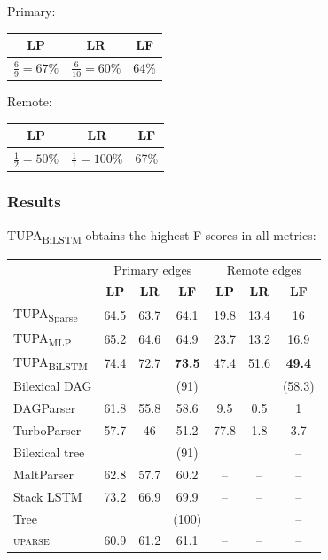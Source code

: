 \documentclass[t,xcolor={svgnames}]{beamer}
\newcommand{\parser}[1]{TUPA\textsubscript{#1}}
\begin{document}
\begin{frame}
\begin{adjustbox}{frame,scale=.75,center}
\begin{tikzpicture}[level distance=15mm, sibling distance=15mm, ->,
	    every circle node/.append style={fill=black}]
	\end{tikzpicture}
\end{adjustbox}
\vfill
\begin{adjustbox}{scale=.75,center}
	Primary:
	\begin{tabular}{ccc}
		\textbf{LP} & \textbf{LR} & \textbf{LF} \\ \hline
		$\frac69=67\%$ & $\frac6{10}=60\%$ & 64\%
	\end{tabular}
	\hspace{1cm}
	Remote:
	\begin{tabular}{ccc}
		\textbf{LP} & \textbf{LR} & \textbf{LF} \\ \hline
		$\frac12=50\%$ & $\frac11=100\%$ & 67\%
	\end{tabular}
\end{adjustbox}
\end{frame}


\begin{frame}
\frametitle{Results}
\parser{BiLSTM} obtains the highest F-scores in all metrics:
\begin{center}
	\begin{tabular}{l|ccc|ccc}
		& \multicolumn{3}{c|}{Primary edges} & \multicolumn{3}{c}{Remote edges} \\
		& \textbf{LP} & \textbf{LR} & \textbf{LF} & \textbf{LP} & \textbf{LR} & \textbf{LF} \\
		\hline
		\parser{Sparse}
		& 64.5 & 63.7 & 64.1 & 19.8 & 13.4 & 16 \\
		\parser{MLP}
		& 65.2 & 64.6 & 64.9 & 23.7 & 13.2 & 16.9 \\
		\parser{BiLSTM}
		& 74.4 & 72.7 & \textbf{73.5} & 47.4 & 51.6 & \textbf{49.4} \\
		\hline
		\scriptsize Bilexical DAG
		& & & \scriptsize (91) & & & \scriptsize (58.3) \\
		DAGParser
		& 61.8 & 55.8 & 58.6 & 9.5 & 0.5 & 1 \\
		TurboParser
		& 57.7 & 46 & 51.2 & 77.8 & 1.8 & 3.7 \\
		\hline
		\scriptsize Bilexical tree
		& & & \scriptsize (91) & & & \scriptsize -- \\
		MaltParser
		& 62.8 & 57.7 & 60.2 & -- & -- & -- \\
		Stack LSTM
		& 73.2 & 66.9 & 69.9 & -- & -- & -- \\
		\hline
		\scriptsize Tree
		& & & \scriptsize (100) & & & \scriptsize -- \\
		\textsc{uparse}
		& 60.9 & 61.2 & 61.1 & -- & -- & --
	\end{tabular}
\end{center}
\end{frame}
\end{document}
